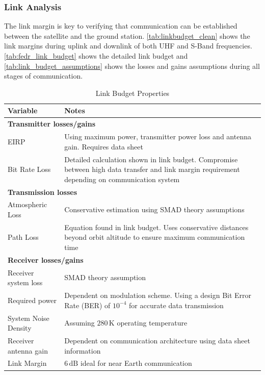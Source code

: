 \documentclass[a4paper, 11pt, conference]{IEEEtran}
\begin{document}
\subsubsection{Link Analysis}
The link margin is key to verifying that communication can be established between the satellite and the ground station. \autoref{tab:linkbudget_clean} shows the link margins during uplink and downlink of both UHF and S-Band frequencies. \autoref{tab:fedr_link_budget} shows the detailed link budget and \autoref{tab:link_budget_assumptions} shows the losses and gains assumptions during all stages of communication.
\begin{table}[h]
    \centering
    \caption{Link Budget Properties}
    \label{tab:link_budget_assumptions}
    \begin{tabularx}{\textwidth}{l X} 
        \toprule
        \textbf{Variable} & \textbf{Notes} \\
        \midrule
        \multicolumn{2}{l}{\textbf{Transmitter losses/gains}} \\ 
        \midrule
        EIRP & Using maximum power, transmitter power loss and antenna gain. Requires data sheet \\
        Bit Rate Loss & Detailed calculation shown in link budget. Compromise between high data transfer and link margin requirement depending on communication system \\
        \midrule
        \multicolumn{2}{l}{\textbf{Transmission losses}} \\
        \midrule
        Atmospheric Loss & Conservative estimation using SMAD theory assumptions \\
        Path Loss & Equation found in link budget. Uses conservative distances beyond orbit altitude to ensure maximum communication time \\
        \midrule
        \multicolumn{2}{l}{\textbf{Receiver losses/gains}} \\
        \midrule
        Receiver system loss & SMAD theory assumption \\
        Required power & Dependent on modulation scheme. Using a design Bit Error Rate (BER) of $10^{-4}$ for accurate data transmission \\
        System Noise Density & Assuming $280\,\mathrm{K}$ operating temperature \\
        Receiver antenna gain & Dependent on communication architecture using data sheet information \\
        \midrule
        Link Margin & $6\,\mathrm{dB}$ ideal for near Earth communication \\
        \bottomrule
    \end{tabularx}
\end{table}
\end{document}
